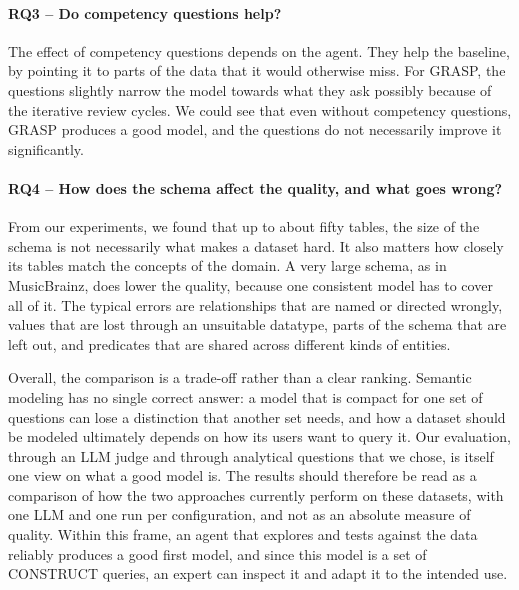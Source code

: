 \paragraph{RQ3 -- Do competency questions help?}
The effect of competency questions depends on the agent. They help the baseline, by pointing it to parts of the data that it would otherwise miss. For GRASP, the questions slightly narrow the model towards what they ask possibly because of the iterative review cycles. We could see that even without competency questions, GRASP produces a good model, and the questions do not necessarily improve it significantly.

\paragraph{RQ4 -- How does the schema affect the quality, and what goes wrong?}
From our experiments, we found that up to about fifty tables, the size of the schema is not necessarily what makes a dataset hard. It also matters how closely its tables match the concepts of the domain. A very large schema, as in MusicBrainz, does lower the quality, because one consistent model has to cover all of it. The typical errors are relationships that are named or directed wrongly, values that are lost through an unsuitable datatype, parts of the schema that are left out, and predicates that are shared across different kinds of entities. 


Overall, the comparison is a trade-off rather than a clear ranking. Semantic modeling has no single correct answer: a model that is compact for one set of questions can lose a distinction that another set needs, and how a dataset should be modeled ultimately depends on how its users want to query it. Our evaluation, through an LLM judge and through analytical questions that we chose, is itself one view on what a good model is. The results should therefore be read as a comparison of how the two approaches currently perform on these datasets, with one LLM and one run per configuration, and not as an absolute measure of quality. Within this frame, an agent that explores and tests against the data reliably produces a good first model, and since this model is a set of CONSTRUCT queries, an expert can inspect it and adapt it to the intended use.

